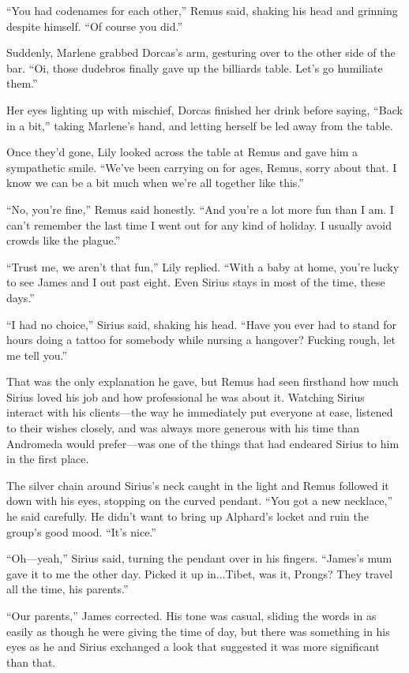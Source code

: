 “You had codenames for each other,” Remus said, shaking his head and grinning despite himself. “Of course you did.”

Suddenly, Marlene grabbed Dorcas’s arm, gesturing over to the other side of the bar. “Oi, those dudebros finally gave up the billiards table. Let’s go humiliate them.”

Her eyes lighting up with mischief, Dorcas finished her drink before saying, “Back in a bit,” taking Marlene’s hand, and letting herself be led away from the table.

Once they’d gone, Lily looked across the table at Remus and gave him a sympathetic smile. “We’ve been carrying on for ages, Remus, sorry about that. I know we can be a bit much when we’re all together like this.”

“No, you’re fine,” Remus said honestly. “And you’re a lot more fun than I am. I can’t remember the last time I went out for any kind of holiday. I usually avoid crowds like the plague.”

“Trust me, we aren’t that fun,” Lily replied. “With a baby at home, you’re lucky to see James and I out past eight. Even Sirius stays in most of the time, these days.”

“I had no choice,” Sirius said, shaking his head. “Have you ever had to stand for hours doing a tattoo for somebody while nursing a hangover? Fucking rough, let me tell you.”

That was the only explanation he gave, but Remus had seen firsthand how much Sirius loved his job and how professional he was about it. Watching Sirius interact with his clients—the way he immediately put everyone at ease, listened to their wishes closely, and was always more generous with his time than Andromeda would prefer—was one of the things that had endeared Sirius to him in the first place.

The silver chain around Sirius’s neck caught in the light and Remus followed it down with his eyes, stopping on the curved pendant. “You got a new necklace,” he said carefully. He didn’t want to bring up Alphard’s locket and ruin the group’s good mood. “It’s nice.”

“Oh—yeah,” Sirius said, turning the pendant over in his fingers. “James’s mum gave it to me the other day. Picked it up in...Tibet, was it, Prongs? They travel all the time, his parents.”

“Our parents,” James corrected. His tone was casual, sliding the words in as easily as though he were giving the time of day, but there was something in his eyes as he and Sirius exchanged a look that suggested it was more significant than that.

